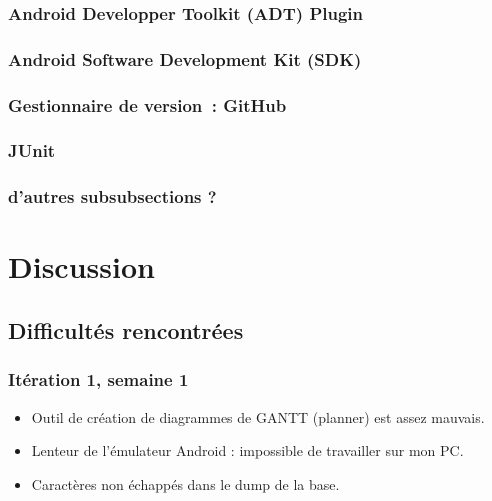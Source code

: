 \documentclass[a4paper,11pt,french]{article}
\begin{document}
\subsubsection{Android Developper Toolkit (ADT) Plugin}
\subsubsection{Android Software Development Kit (SDK)}
\subsubsection{Gestionnaire de version~: GitHub}
\subsubsection{JUnit}
\subsubsection{d'autres subsubsections ?}


\section{Discussion}
\subsection{Difficultés rencontrées}
\subsubsection{Itération 1, semaine 1}
\begin{itemize}
\item Outil de création de diagrammes de GANTT (planner) est assez mauvais.
\item Lenteur de l'émulateur Android : impossible de travailler sur mon PC.%
\item Caractères non échappés dans le dump de la base.%
\end{itemize}
\end{document}

